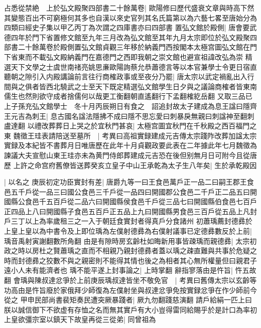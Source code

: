 占悉從禁絶　上於弘文殿聚四部書二十餘萬卷|{
	歐陽修曰歷代盛衰文章與時高下然其變態百出不可窮極何其多也自漢以來史官列其名氏篇第以為六藝七畧至唐始分為四類曰經史子集以甲乙丙丁為次謂之四庫書亦曰四部書}
置弘文館於殿側|{
	唐會要武德四年於門下省置修文館至九年三月改為弘文館至其年九月太宗即位於弘文殿聚四部書二十餘萬卷於殿側置弘文館貞觀三年移於納義門西按閣本太極宫圖弘文館在門下省東而不載弘文殿納義門在嘉德門之西即我朝之崇文館也避宣祖諱改弘為崇}
精選天下文學之士虞世南禇亮姚思亷歐陽詢蔡允恭蕭德言等以本官兼學士令更日宿直聽朝之隙引入内殿講論前言往行商榷政事或至夜分乃罷|{
	唐太宗以武定禍亂出入行間與之俱者皆西北驍武之士至天下既定精選弘文館學生日夕與之議論商榷者皆東南儒生也然則欲守成者捨儒何以哉更工衡翻朝直遙翻行下孟翻榷紇岳翻}
又取三品已上子孫充弘文館學士　冬十月丙辰朔日有食之　詔追封故太子建成為息王諡曰隱齊王元吉為刺王|{
	息古國名諡法隱拂不成曰隱不思忘愛曰刺暴戾無親曰刺諡神至翻刺盧達翻}
以禮改葬葬日上哭之於宜秋門甚哀|{
	太極宫圖宜秋門在千秋殿之西百福門之東}
魏徵王珪表請陪送至墓所　|{
	考異曰高祖實録建成元吉傳太宗踐阼改葬加諡太宗實録及本紀皆不書葬月日唯唐歷在此年十月貞觀政要此表在二年據此年七月魏徵為諫議大夫宣慰山東王珪亦未為黄門侍郎葬建成元吉恐在後但别無月日可附今且從唐歷}
上許之命宫府舊僚皆送葬癸亥立皇子中山王承乾為太子生八年矣|{
	生於承乾殿因}


|{
	以名之}
庚辰初定功臣實封有差|{
	唐爵九等一曰王食邑萬戶正一品二曰嗣王郡王食邑五千戶從一品三曰國公食邑三千戶從一品四曰開國郡公食邑二千戶正二品五曰開國縣公食邑千五百戶從二品六曰開國縣侯食邑千戶從三品七曰開國縣伯食邑七百戶正四品上八曰開國縣子食邑五百戶正五品上九曰開國縣男食邑三百戶從五品上凡封戶三丁以上為率歲租三之一入于朝廷食實封者得真戶分食諸州}
初蕭瑀薦封德彞於上皇上皇以為中書令及上即位瑀為左僕射德彞為右僕射議事已定德彞數反於上前|{
	瑀音禹射寅謝翻數所角翻}
由是有隙時房玄齡杜如晦新用事皆疎瑀而親德彞|{
	太宗初政之時以房杜之賢蕭瑀之直而不相親乃親封德彞者蓋以瑀之疎直難與共事於危疑之時而封德彞之狡數不與之親密則不能得其情也後之為相者其心無所權量但曰親君子遠小人未有能濟者也}
瑀不能平遂上封事論之|{
	上時掌翻}
辭指寥落由是忤旨|{
	忤五故翻}
會瑀與陳叔達忿爭於上前庚辰瑀叔達皆坐不敬免官　|{
	考異曰舊傳太宗以玄齡等功高由是忤旨廢於家俄拜少師復為左僕射坐與叔達忿爭免按實録忿爭在作少師前今從之}
甲申民部尚書裴矩奏民遭突厥暴踐者|{
	厥九勿翻踐慈演翻}
請戶給絹一匹上曰朕以誠信御下不欲虚有存恤之名而無其實戶有大小豈得雷同給賜乎於是計口為率初上皇欲彊宗室以鎮天下故皇再從三從弟|{
	同曾祖為}


